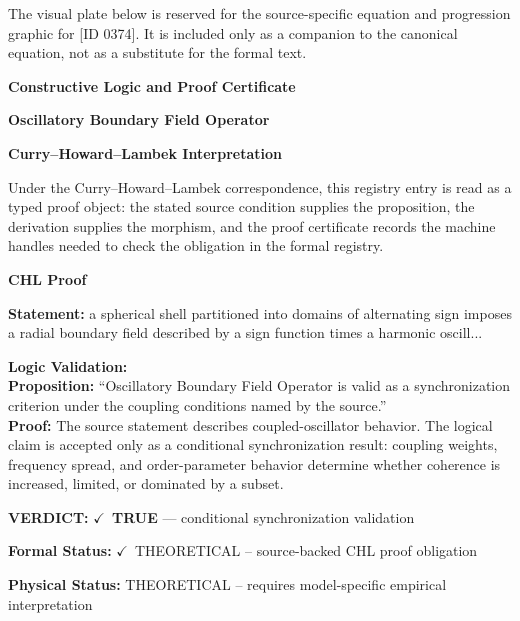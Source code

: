 \begingroup\footnotesize\sloppy
The visual plate below is reserved for the source-specific equation and progression graphic for [ID 0374]. It is included only as a companion to the canonical equation, not as a substitute for the formal text.
\par\endgroup
\ifTZPDarkEdition
{}
\fi

\clearpage
\begingroup\tzpsupportsetup
\noindent\textbf{\fontsize{10.8pt}{12.8pt}\selectfont [ID 0374] Constructive Logic and Proof Certificate}\par
\noindent\textbf{\fontsize{10pt}{12pt}\selectfont Oscillatory Boundary Field Operator}\par
\vspace{0.45em}
\begingroup
\footnotesize
\setlength{\parskip}{0.22em}
\setlength{\parindent}{0pt}
\noindent\textbf{Curry--Howard--Lambek Interpretation}\par
Under the Curry--Howard--Lambek correspondence, this registry entry is read as a typed proof
object: the stated source condition supplies the proposition, the derivation supplies the
morphism, and the proof certificate records the machine handles needed to check the obligation
in the formal registry.

\vspace{0.45em}
\noindent\textbf{CHL Proof}\par
\textbf{Statement:} a spherical shell partitioned into domains of alternating sign imposes a radial boundary
field described by a sign function times a harmonic oscill...

\textbf{Logic Validation:}\\
\textbf{Proposition:} ``Oscillatory Boundary Field Operator is valid as a synchronization criterion under the
coupling conditions named by the source.''\\
\textbf{Proof:} The source statement describes coupled-oscillator behavior. The logical claim is
accepted only as a conditional synchronization result: coupling weights, frequency
spread, and order-parameter behavior determine whether coherence is increased, limited,
or dominated by a subset.

\textbf{VERDICT:} \ensuremath{\checkmark}\ \textbf{TRUE} --- conditional synchronization validation

\textbf{Formal Status:} \ensuremath{\checkmark}\ THEORETICAL -- source-backed CHL proof obligation

\textbf{Physical Status:} THEORETICAL -- requires model-specific empirical interpretation
\par\vspace{0.45em}
\par
\ifTZPDarkEdition
{}
\fi
\endgroup
\endgroup
